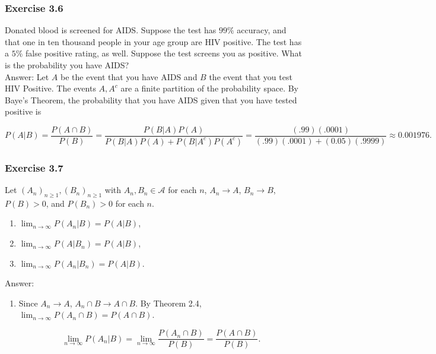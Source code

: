 \documentclass{article}
\begin{document}
{\subsubsection*{Exercise 3.6}

Donated blood is screened for AIDS. Suppose the test has $99\%$ accuracy, and that one in ten thousand people in your age group are HIV positive. The test has a $5\%$ false positive rating, as well. Suppose the test screens you as
positive. What is the probability you have AIDS? \\

Answer: Let $A$ be the event that you have AIDS and $B$ the event that you test HIV Positive. The events $A, A^c$ are a finite partition of the probability space. By Baye's Theorem, the probability that you have AIDS given that you have tested positive is

$$
P(A \vert B) = \frac{P(A \cap B)}{P(B)}
= \frac{P(B \vert A)P(A)}{P(B \vert A)P(A) + P(B \vert A^c) P(A^c)}
= \frac{(.99)(.0001)}{(.99)(.0001) + (0.05)(.9999)} \approx 0.001976.
$$

\subsubsection*{Exercise 3.7}

Let $(A_n)_{n\geq 1}, (B_n)_{n\geq 1}$ with $A_n, B_n \in \mathcal{A}$ for each $n$, $A_n \rightarrow A$, $B_n \rightarrow B$, $P(B) > 0$, and $P(B_n) > 0$ for each $n$.

\begin{enumerate}
\item $\lim_{n \rightarrow \infty} P(A_n \vert B) = P(A \vert B)$,

\item $\lim_{n \rightarrow \infty} P(A \vert B_n) = P(A \vert B)$,

\item $\lim_{n \rightarrow \infty} P(A_n \vert B_n) = P(A \vert B)$.

\end{enumerate}

Answer: 

\begin{enumerate}
\item Since $A_n \rightarrow A$, $A_n \cap B \rightarrow A \cap B$. By Theorem 2.4, $\lim_{n\rightarrow \infty} P(A_n \cap B) = P(A\cap B)$.

$$
\lim_{n\rightarrow \infty} P(A_n \vert B) = \lim_{n\rightarrow \infty} \frac{P(A_n \cap B)}{P(B)} = \frac{P(A \cap B)}{P(B)}.
$$


\end{enumerate}}
\end{document}

